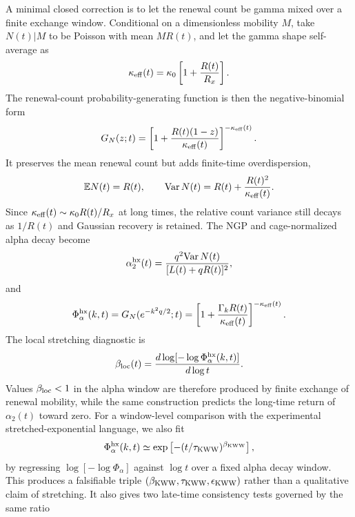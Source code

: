 \documentclass[aps,preprint,onecolumn,superscriptaddress,nofootinbib]{revtex4-2}
\begin{document}
A minimal closed correction is to let the renewal count be gamma mixed over a
finite exchange window. Conditional
on a dimensionless mobility $M$, take $N(t)|M$ to be Poisson with mean
$MR(t)$, and let the gamma shape self-average as
\begin{equation}
  \kappa_{\rm eff}(t)=
  \kappa_0\left[1+\frac{R(t)}{R_x}\right].
\end{equation}
The renewal-count probability-generating function is then the negative-binomial
form
\begin{equation}
  G_N(z;t)=
  \left[
    1+\frac{R(t)(1-z)}{\kappa_{\rm eff}(t)}
  \right]^{-\kappa_{\rm eff}(t)} .
\end{equation}
It preserves the mean renewal count but adds finite-time overdispersion,
\begin{equation}
  \mathbb{E}N(t)=R(t),\qquad
  {\rm Var}\,N(t)=R(t)+\frac{R(t)^2}{\kappa_{\rm eff}(t)}.
\end{equation}
Since $\kappa_{\rm eff}(t)\sim \kappa_0R(t)/R_x$ at long times, the relative
count variance still decays as $1/R(t)$ and Gaussian recovery is retained.
The NGP and cage-normalized alpha decay become
\begin{equation}
  \alpha_2^{\rm hx}(t)=
  \frac{q^2{\rm Var}\,N(t)}
       {[L(t)+qR(t)]^2},
\end{equation}
and
\begin{equation}
  \Phi_\alpha^{\rm hx}(k,t)=
  G_N(e^{-k^2q/2};t)
  =
  \left[
    1+\frac{\Gamma_kR(t)}{\kappa_{\rm eff}(t)}
  \right]^{-\kappa_{\rm eff}(t)} .
\end{equation}
The local stretching diagnostic is
\begin{equation}
  \beta_{\rm loc}(t)=
  \frac{d\log[-\log\Phi_\alpha^{\rm hx}(k,t)]}{d\log t}.
\end{equation}
Values $\beta_{\rm loc}<1$ in the alpha window are therefore produced by finite
exchange of renewal mobility, while the same construction predicts the
long-time return of $\alpha_2(t)$ toward zero.
For a window-level comparison with the experimental stretched-exponential
language, we also fit
\begin{equation}
  \Phi_\alpha^{\rm hx}(k,t)\simeq
  \exp\left[-(t/\tau_{\rm KWW})^{\beta_{\rm KWW}}\right],
\end{equation}
by regressing $\log[-\log\Phi_\alpha]$ against $\log t$ over a fixed alpha
decay window. This produces a falsifiable triple
$(\beta_{\rm KWW},\tau_{\rm KWW},\epsilon_{\rm KWW})$ rather than a qualitative
claim of stretching.
It also gives two late-time consistency tests governed by the same ratio
\end{document}
